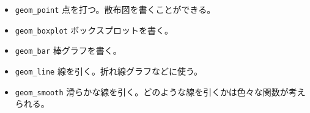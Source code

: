 \begin{itemize}
	\item \verb|geom_point| 点を打つ。散布図を書くことができる。
	\item \verb|geom_boxplot| ボックスプロットを書く。
	\item \verb|geom_bar| 棒グラフを書く。
	\item \verb|geom_line| 線を引く。折れ線グラフなどに使う。
	\item \verb|geom_smooth| 滑らかな線を引く。どのような線を引くかは色々な関数が考えられる。
\end{itemize}

